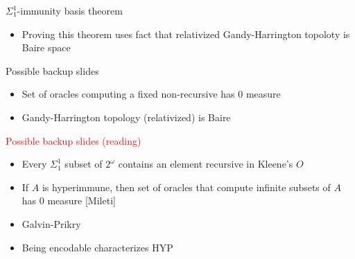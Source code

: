 \documentclass[notes]{beamer}
\begin{document}
\begin{frame}{$\Sigma_1^1$-immunity basis theorem}
  \begin{itemize}
    \item Proving this theorem uses fact that relativized Gandy-Harrington
      topoloty is Baire space
  \end{itemize}
\end{frame}

\begin{frame}{Possible backup slides}
  \begin{itemize}
    \item Set of oracles computing a fixed non-recursive has 0 measure
    \item Gandy-Harrington topology (relativized) is Baire
  \end{itemize}
\end{frame}

\begin{frame}{\textcolor{red}{Possible backup slides (reading)}}
  \begin{itemize}
    \item Every $\Sigma_1^1$ subset of $2^\omega$ contains an element
      recursive in Kleene's $O$
    \item If $A$ is hyperimmune, then set of oracles that compute
      infinite subsets of $A$ has 0 measure [Mileti]
    \item Galvin-Prikry
    \item Being encodable characterizes HYP
  \end{itemize}
\end{frame}
\end{document}
